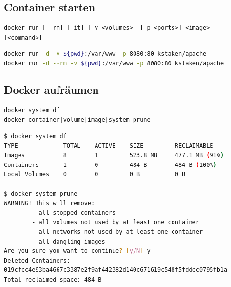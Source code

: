 \subsection{Container starten}
\begin{verbatim}
docker run [--rm] [-it] [-v <volumes>] [-p <ports>] <image> [<command>]
\end{verbatim}
\begin{lstlisting}[caption=Docker-Run-Beispiel, language=bash, label=lst:docker-run-example]
docker run -d -v ${pwd}:/var/www -p 8080:80 kstaken/apache
docker run -d --rm -v ${pwd}:/var/www -p 8080:80 kstaken/apache
\end{lstlisting}

\subsection{Docker aufräumen}
\begin{verbatim}
docker system df
docker container|volume|image|system prune
\end{verbatim}
\begin{lstlisting}[caption=Docker-Prune-Beispiel, language=bash, label=lst:docker-prune-example]
$ docker system df
TYPE             TOTAL    ACTIVE    SIZE         RECLAIMABLE
Images           8        1         523.8 MB     477.1 MB (91%)
Containers       1        0         484 B        484 B (100%)
Local Volumes    0        0         0 B          0 B

$ docker system prune
WARNING! This will remove:
        - all stopped containers
        - all volumes not used by at least one container
        - all networks not used by at least one container
        - all dangling images
Are you sure you want to continue? [y/N] y
Deleted Containers:
019cfcc4e93ba4667c3387e2f9af442382d140c671619c548f5fddcc0795fb1a
Total reclaimed space: 484 B
\end{lstlisting}
